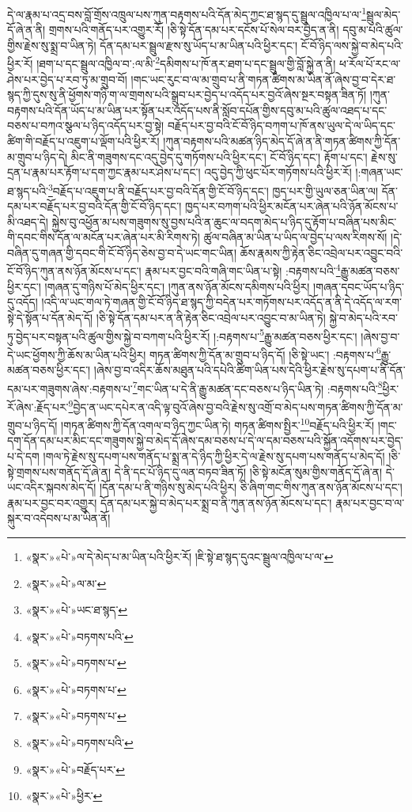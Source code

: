 དེ་ལ་རྣམ་པ་འདྲ་བས་བློ་གྲོས་འཁྲུལ་པས་ཀུན་བརྟགས་པའི་དོན་མེད་ཀྱང་ཐ་སྙད་དུ་སྦྲུལ་འཁྱིལ་པ་ལ་\footnote{«སྣར་»«པེ་»ལ་དེ་མེད་པ་མ་ཡིན་པའི་ཕྱིར་རོ། །ཇི་སྟེ་ཐ་སྙད་དུའང་སྦྲུལ་འཁྱིལ་པ་ལ་}སྦྲུལ་མེད་དོ་ཞེ་ན་ནི། གྲགས་པའི་གནོད་པར་འགྱུར་རོ། །ཅི་སྟེ་དོན་དམ་པར་དངོས་པོ་སེལ་བར་བྱེད་ན་ནི། དབུ་མ་པའི་ཚུལ་གྱིས་རྗེས་སུ་སྨྲ་བ་ཡིན་ཏེ། དོན་དམ་པར་སྦྲུལ་རྫས་སུ་ཡོད་པ་མ་ཡིན་པའི་ཕྱིར་དང་། ངོ་བོ་ཉིད་ལས་སྐྱེ་བ་མེད་པའི་ཕྱིར་རོ། །ཐག་པ་དང་སྦྲུལ་འཁྱིལ་བ་:ལ་མི་\footnote{«སྣར་»«པེ་»ལ་མ་}དམིགས་པ་ཁོ་ནར་ཐག་པ་དང་སྦྲུལ་གྱི་བློ་སྐྱེ་ན་ནི། ཕ་རོལ་པོ་རང་ལ་ཤེས་པར་བྱེད་པ་རབ་ཏུ་མ་གྲུབ་བོ། །གང་ཡང་རུང་བ་ལ་མ་གྲུབ་པ་ནི་གཏན་ཚིགས་མ་ཡིན་ནོ་ཞེས་བྱ་བ་དེར་ཐ་སྙད་ཀྱི་དུས་སུ་ནི་ཕྱོགས་གཉི་ག་ལ་གྲགས་པའི་སྒྲུབ་པར་བྱེད་པ་འདོད་པར་བྱའོ་ཞེས་སྔར་བསྟན་ཟིན་ཏོ། །ཀུན་བརྟགས་པའི་དོན་ཡོད་པ་མ་ཡིན་པར་སྟོན་པར་འདོད་པས་ནི་སློབ་དཔོན་གྱིས་དབུ་མ་པའི་ཚུལ་འཐད་པ་དང་བཅས་པ་བཀའ་སྩལ་པ་ཉིད་འདོད་པར་བྱ་སྟེ། བརྗོད་པར་བྱ་བའི་ངོ་བོ་ཉིད་བཀག་པ་ཁོ་ནས་ཡུལ་དེ་ལ་ཡིད་དང་ཚིག་གི་བརྗོད་པ་འཇུག་པ་ལྡོག་པའི་ཕྱིར་རོ། །ཀུན་བརྟགས་པའི་མཚན་ཉིད་མེད་དོ་ཞེ་ན་ནི་གཏན་ཚིགས་ཀྱི་དོན་མ་གྲུབ་པ་ཉིད་དེ། མིང་ནི་གཟུགས་དང་འདུ་བྱེད་དུ་གཏོགས་པའི་ཕྱིར་དང་། ངོ་བོ་ཉིད་དང་། རྟོག་པ་དང་། རྗེས་སུ་དྲན་པ་རྣམ་པར་རྟོག་པ་དག་ཀྱང་རྣམ་པར་ཤེས་པ་དང་། འདུ་བྱེད་ཀྱི་ཕུང་པོར་གཏོགས་པའི་ཕྱིར་རོ། །:གཞན་ཡང་ཐ་སྙད་པའི་\footnote{«སྣར་»«པེ་»ཡང་ཐ་སྙད་}བརྗོད་པ་འཇུག་པ་ནི་བརྗོད་པར་བྱ་བའི་དོན་གྱི་ངོ་བོ་ཉིད་དང་། ཁྱད་པར་གྱི་ཡུལ་ཅན་ཡིན་ལ། དོན་དམ་པར་བརྗོད་པར་བྱ་བའི་དོན་གྱི་ངོ་བོ་ཉིད་དང་། ཁྱད་པར་བཀག་པའི་ཕྱིར་མངོན་པར་ཞེན་པའི་ཉོན་མོངས་པ་མི་འཐད་དེ། སྐྱེས་བུ་འཕྱོན་མ་པས་གཟུགས་སུ་བྱས་པའི་ན་ཆུང་ལ་བདག་མེད་པ་ཉིད་དུ་རྟོག་པ་བཞིན་པས་མིང་གི་དབང་གིས་དོན་ལ་མངོན་པར་ཞེན་པར་མི་རིགས་ཏེ། ཚུལ་བཞིན་མ་ཡིན་པ་ཡིད་ལ་བྱེད་པ་ལས་རིགས་སོ། །དེ་བཞིན་དུ་གཞན་གྱི་དབང་གི་ངོ་བོ་ཉིད་ཅེས་བྱ་བ་དེ་ཡང་གང་ཡིན། ཆོས་རྣམས་ཀྱི་རྟེན་ཅིང་འབྲེལ་པར་འབྱུང་བའི་ངོ་བོ་ཉིད་ཀུན་ནས་ཉོན་མོངས་པ་དང་། རྣམ་པར་བྱང་བའི་གཞི་གང་ཡིན་པ་སྟེ། :བརྟགས་པའི་\footnote{«སྣར་»«པེ་»བཏགས་པའི་}རྒྱུ་མཚན་བཅས་ཕྱིར་དང་། །གཞན་དུ་གཉིས་པོ་མེད་ཕྱིར་དང་། །ཀུན་ནས་ཉོན་མོངས་དམིགས་པའི་ཕྱིར། །གཞན་དབང་ཡོད་པ་ཉིད་དུ་འདོད། །འདི་ལ་ཡང་གལ་ཏེ་གཞན་གྱི་ངོ་བོ་ཉིད་ཐ་སྙད་ཀྱི་བདེན་པར་གཏོགས་པར་འདོད་ན་ནི་དེ་འདོད་ལ་རག་སྟེ་དེ་སྟོན་པ་དོན་མེད་དོ། །ཅི་སྟེ་དོན་དམ་པར་ན་ནི་རྟེན་ཅིང་འབྲེལ་པར་འབྱུང་བ་མ་ཡིན་ཏེ། སྐྱེ་བ་མེད་པའི་རབ་ཏུ་བྱེད་པར་བསྟན་པའི་ཚུལ་གྱིས་སྐྱེ་བ་བཀག་པའི་ཕྱིར་རོ། །:བརྟགས་པ་\footnote{«སྣར་»«པེ་»བཏགས་པ་}རྒྱུ་མཚན་བཅས་ཕྱིར་དང་། །ཞེས་བྱ་བ་དེ་ཡང་ཕྱོགས་ཀྱི་ཆོས་མ་ཡིན་པའི་ཕྱིར། གཏན་ཚིགས་ཀྱི་དོན་མ་གྲུབ་པ་ཉིད་དོ། །ཅི་སྟེ་ཡང་། :བརྟགས་པ་\footnote{«སྣར་»«པེ་»བཏགས་པ་}རྒྱུ་མཚན་བཅས་ཕྱིར་དང་། །ཞེས་བྱ་བ་འདིར་ཆོས་མཐུན་པའི་དཔེའི་ཚིག་ཡིན་པས་དེའི་ཕྱིར་རྗེས་སུ་དཔག་པ་ནི་དོན་དམ་པར་གཟུགས་ཞེས་:བརྟགས་པ་\footnote{«སྣར་»«པེ་»བཏགས་པ་}གང་ཡིན་པ་དེ་ནི་རྒྱུ་མཚན་དང་བཅས་པ་ཉིད་ཡིན་ཏེ། :བརྟགས་པའི་\footnote{«སྣར་»«པེ་»བཏགས་པའི་}ཕྱིར་རོ་ཞེས་:རྗོད་པར་\footnote{«སྣར་»«པེ་»བརྗོད་པར་}བྱེད་ན་ཡང་དཔེར་ན་འདི་ལྟ་བུའོ་ཞེས་བྱ་བའི་རྗེས་སུ་འགྲོ་བ་མེད་པས་གཏན་ཚིགས་ཀྱི་དོན་མ་གྲུབ་པ་ཉིད་དོ། །གཏན་ཚིགས་ཀྱི་དོན་འགལ་བ་ཉིད་ཀྱང་ཡིན་ཏེ། གཏན་ཚིགས་སྤྱིར་\footnote{«སྣར་»«པེ་»ཕྱིར་}བརྗོད་པའི་ཕྱིར་རོ། །གང་དག་དོན་དམ་པར་མིང་དང་གཟུགས་སྐྱེ་བ་མེད་དོ་ཞེས་དམ་བཅས་པ་དེ་ལ་དམ་བཅས་པའི་སྐྱོན་འདོགས་པར་བྱེད་པ་དེ་དག །གལ་ཏེ་རྗེས་སུ་དཔག་པས་གནོད་པ་སྨྲ་ན་དེ་ཉིད་ཀྱི་ཕྱིར་དེ་ལ་རྗེས་སུ་དཔག་པས་གནོད་པ་མེད་དོ། །ཅི་སྟེ་གྲགས་པས་གནོད་དོ་ཞེ་ན། དེ་ནི་དང་པོ་ཉིད་དུ་ལན་བཏབ་ཟིན་ཏོ། །ཅི་སྟེ་མངོན་སུམ་གྱིས་གནོད་དོ་ཞེ་ན། དེ་ཡང་འདིར་སྐབས་མེད་དོ། །དོན་དམ་པ་ནི་གཉིས་སུ་མེད་པའི་ཕྱིར། ཅི་ཞིག་གང་གིས་ཀུན་ནས་ཉོན་མོངས་པ་དང་། རྣམ་པར་བྱང་བར་འགྱུར། དོན་དམ་པར་སྐྱེ་བ་མེད་པར་སྨྲ་བ་ནི་ཀུན་ནས་ཉོན་མོངས་པ་དང་། རྣམ་པར་བྱང་བ་ལ་སྐུར་བ་འདེབས་པ་མ་ཡིན་ནོ། 